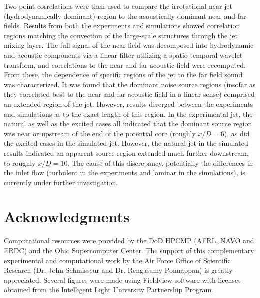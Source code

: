 \documentclass[english]{aiaa-tc}
\begin{document}
Two-point correlations were then used to compare the irrotational near jet (hydrodynamically dominant) region to the acoustically dominant near and far fields. 
Results from both the experiments and simulations showed correlation regions matching the convection of the large-scale structures through the jet mixing layer. 
The full signal of the near field was decomposed into hydrodynamic and acoustic components via a linear filter utilizing a spatio-temporal wavelet transform, and correlations to the near and far acoustic field were recomputed. 
From these, the dependence of specific regions of the jet to the far field sound was characterized.
It was found that the dominant noise source regions (insofar as they correlated best to the near and far acoustic field in a linear sense) comprised an extended region of the jet. However, results diverged between the experiments and simulations as to the exact length of this region. In the experimental jet, the natural as well as the excited cases all indicated that the dominant source region was near or upstream of the end of the potential core (roughly $x/D = 6$), as did the excited cases in the simulated jet. However, the natural jet in the simulated results indicated an apparent source region extended much further downstream, to roughly $x/D = 10$. The cause of this discrepancy, potentially the differences in the inlet flow (turbulent in the experiments and laminar in the simulations), is currently under further investigation. 

\section*{Acknowledgments}
   Computational resources were provided by the DoD HPCMP (AFRL, NAVO
   and ERDC) and the Ohio Supercomputer Center. The support of this
   complementary experimental and computational work by the Air Force
   Office of Scientific Research (Dr. John Schmisseur and
   Dr. Rengasamy Ponnappan) is greatly appreciated. Several figures
   were made using Fieldview software with licenses obtained from the
   Intelligent Light University Partnership Program. 



\end{document}
